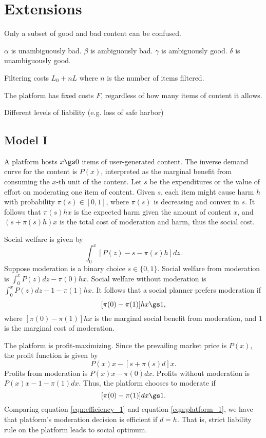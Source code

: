 \section{Extensions}

Only a subset of good and bad content can be confused.

$\alpha$ is unambiguously bad.
$\beta$ is ambiguously bad.
$\gamma$ is ambiguously good.
$\delta$ is unambiguously good.

Filtering costs $L_0 + nL$ where $n$ is the number of items filtered.

The platform has fixed costs $F$, regardless of how many items of content it allows.

Different levels of liability (e.g. loss of safe harbor)









\subsection{Model I}
A platform hosts $x\gs 0$ items of user-generated content. 
The inverse demand curve for the content is $P(x)$, interpreted as the marginal benefit from consuming the $x$-th unit of the content. 
Let $s$ be the expenditures or the value of effort on moderating one item of content.
Given $s$, each item might cause harm $h$ with probability $\pi(s)\in[0,1]$, where $\pi(s)$ is decreasing and convex in $s$. It follows that $\pi(s)hx$ is the expected harm given the amount of content $x$, and $(s+\pi(s)h)x$ is the total cost of moderation and harm, thus the social cost.

Social welfare is given by 
\begin{equation}
    \int_0^x [P(z)-s-\pi(s)h]dz.
\end{equation}
Suppose moderation is a binary choice $s\in\{0,1\}$. Social welfare from moderation is $\int_0^x P(z)dz-\pi(0)hx$. Social welfare without moderation is $\int_0^x P(z)dz-1-\pi(1)hx$. It follows that a social planner prefers moderation if 
\begin{equation}\label{eqn:efficiency_1}
    [\pi(0)-\pi(1)]hx\gs 1,
\end{equation}
where $[\pi(0)-\pi(1)]hx$ is the marginal social benefit from moderation, and $1$ is the marginal cost of moderation. 

The platform is profit-maximizing. Since the prevailing market price is $P(x)$, the profit function is given by 
\begin{equation}
    P(x)x-[s+\pi(s)d]x.
\end{equation}
Profits from moderation is $P(x)x-\pi(0)dx$. Profits without moderation is $P(x)x-1-\pi(1)dx$. Thus, the platform chooses to moderate if 
\begin{equation}\label{eqn:platform_1}
    [\pi(0)-\pi(1)]dx\gs 1.
\end{equation}
Comparing equation \ref{eqn:efficiency_1} and equation \ref{eqn:platform_1}, we have that platform's moderation decision is efficient if $d=h$. That is, strict liability rule on the platform leads to social optimum. 

